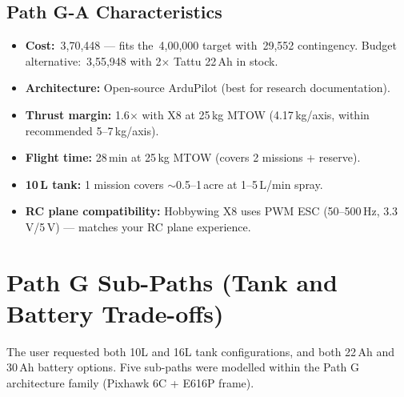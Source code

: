 \documentclass[11pt,a4paper]{article}
\newcommand{\Rs}{\rupee\,}
\begin{document}
\subsection{Path G-A Characteristics}
\begin{itemize}
  \item \textbf{Cost:} \Rs{}3,70,448 --- fits the \Rs{}4,00,000 target with \Rs{}29,552 contingency. Budget alternative: \Rs{}3,55,948 with 2$\times$ Tattu 22\,Ah in stock.
  \item \textbf{Architecture:} Open-source ArduPilot (best for research documentation).
  \item \textbf{Thrust margin:} 1.6$\times$ with X8 at 25\,kg MTOW (4.17\,kg/axis, within recommended 5--7\,kg/axis).
  \item \textbf{Flight time:} 28\,min at 25\,kg MTOW (covers 2 missions + reserve).
  \item \textbf{10\,L tank:} 1 mission covers $\sim$0.5--1\,acre at 1--5\,L/min spray.
  \item \textbf{RC plane compatibility:} Hobbywing X8 uses PWM ESC (50--500\,Hz, 3.3\,V/5\,V) --- matches your RC plane experience.
\end{itemize}

\section{Path G Sub-Paths (Tank and Battery Trade-offs)}

The user requested both 10L and 16L tank configurations, and both 22\,Ah and 30\,Ah battery options. Five sub-paths were modelled within the Path G architecture family (Pixhawk 6C + E616P frame).
\end{document}

